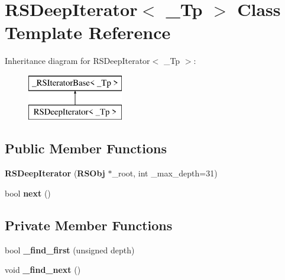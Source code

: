 \section{R\-S\-Deep\-Iterator$<$ \-\_\-\-Tp $>$ Class Template Reference}
\label{classRSDeepIterator}
Inheritance diagram for R\-S\-Deep\-Iterator$<$ \-\_\-\-Tp $>$\-:\begin{figure}[H]
\begin{center}
\leavevmode
\includegraphics[height=2.000000cm]{classRSDeepIterator}
\end{center}
\end{figure}
\subsection*{Public Member Functions}
\begin{DoxyCompactItemize}
\item 
{\bfseries R\-S\-Deep\-Iterator} ({\bf R\-S\-Obj} $\ast$\-\_\-root, int \-\_\-max\-\_\-depth=31)\label{classRSDeepIterator_a16162dbbc162fe7716f6bd74a8d4b2c1}

\item 
bool {\bfseries next} ()\label{classRSDeepIterator_aae0a761b0662e11ce2e2b1c909c6d74f}

\end{DoxyCompactItemize}
\subsection*{Private Member Functions}
\begin{DoxyCompactItemize}
\item 
bool {\bfseries \-\_\-find\-\_\-first} (unsigned depth)\label{classRSDeepIterator_ac7293f782dda57e237f51f389ee58fa5}

\item 
void {\bfseries \-\_\-find\-\_\-next} ()\label{classRSDeepIterator_ac7c7e863c1e7a867c66a45e81cd948cb}

\end{DoxyCompactItemize}
